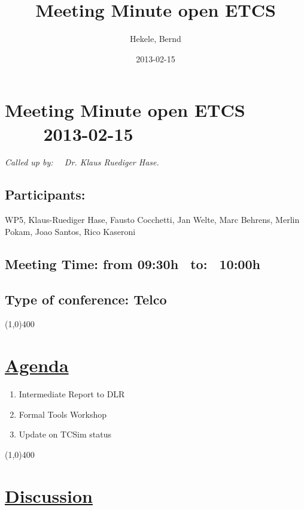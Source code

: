 \documentclass[a4paper]{article}
\title{Meeting Minute open ETCS}
\author{Hekele, Bernd}
\date{2013-02-15}
\begin{document}
\section*{\large{Meeting Minute open ETCS \ \ \ \ 2013-02-15}}

\large{\emph{Called up by: \ \  Dr. Klaus Ruediger Hase.}}

\subsection*{Participants:} 
WP5, Klaus-Ruediger Hase, Fausto Cocchetti, Jan Welte,  Marc Behrens, Merlin Pokam, Joao Santos, Rico Kaseroni

\subsection*{Meeting Time: from 09:30h \ to: \ 10:00h}

\subsection*{Type of conference: Telco}

\line(1,0){400}
\section*{\underline{Agenda}}
\begin{enumerate}
\item Intermediate Report to DLR
\item Formal Tools Workshop
\item Update on TCSim status
\end{enumerate}
\line(1,0){400}
\section*{\underline{Discussion}}
\end{document}
